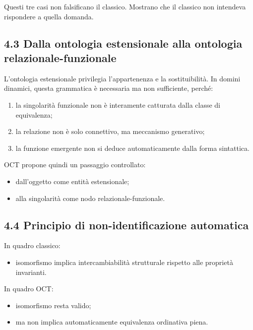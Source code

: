 Questi tre casi non falsificano il classico. Mostrano che il classico non intendeva rispondere a quella domanda.

\subsection{4.3 Dalla ontologia estensionale alla ontologia relazionale-funzionale}

L'ontologia estensionale privilegia l'appartenenza e la sostituibilità. In domini dinamici, questa grammatica è necessaria ma non sufficiente, perché:

\begin{enumerate}
\def\labelenumi{\arabic{enumi}.}
\tightlist
\item
  la singolarità funzionale non è interamente catturata dalla classe di equivalenza;
\item
  la relazione non è solo connettivo, ma meccanismo generativo;
\item
  la funzione emergente non si deduce automaticamente dalla forma sintattica.
\end{enumerate}

OCT propone quindi un passaggio controllato:

\begin{itemize}
\tightlist
\item
  dall'oggetto come entità estensionale;
\item
  alla singolarità come nodo relazionale-funzionale.
\end{itemize}

\subsection{4.4 Principio di non-identificazione automatica}

In quadro classico:

\begin{itemize}
\tightlist
\item
  isomorfismo implica intercambiabilità strutturale rispetto alle proprietà invarianti.
\end{itemize}

In quadro OCT:

\begin{itemize}
\tightlist
\item
  isomorfismo resta valido;
\item
  ma non implica automaticamente equivalenza ordinativa piena.
\end{itemize}

